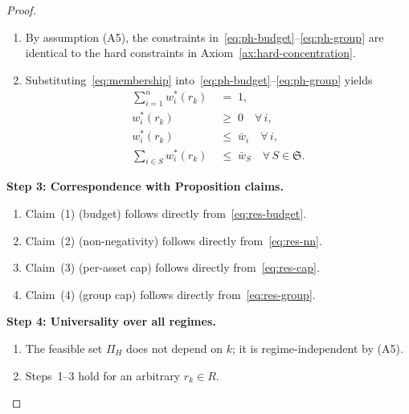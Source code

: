 \documentclass[12pt,openany]{book}
\numberwithin{equation}{chapter}
\theoremstyle{plain}
\theoremstyle{definition}
\theoremstyle{remark}
\def\mathcal#1{#1}%
\begin{document}
\begin{proof}
\begin{enumerate}
  \item By assumption \textup{(A5)}, the constraints
        in~\eqref{eq:ph-budget}--\eqref{eq:ph-group} are
        identical to the hard constraints in
        Axiom~\ref{ax:hard-concentration}.

  \item Substituting~\eqref{eq:membership}
        into~\eqref{eq:ph-budget}--\eqref{eq:ph-group} yields
        \begin{align}
          \sum_{i=1}^{n} w_i^{*}(r_k)
          &\;=\; 1,
          \label{eq:res-budget}\\
          w_i^{*}(r_k)
          &\;\geq\; 0
          \quad \forall\,i,
          \label{eq:res-nn}\\
          w_i^{*}(r_k)
          &\;\leq\; \bar{w}_i
          \quad \forall\,i,
          \label{eq:res-cap}\\
          \sum_{i \in \mathcal{S}} w_i^{*}(r_k)
          &\;\leq\; \bar{w}_{\mathcal{S}}
          \quad \forall\,\mathcal{S} \in \mathfrak{S}.
          \label{eq:res-group}
        \end{align}
\end{enumerate}

\medskip
\noindent
\textbf{Step 3: Correspondence with Proposition claims.}

\begin{enumerate}
  \item Claim~(1) (budget) follows directly
        from~\eqref{eq:res-budget}.

  \item Claim~(2) (non-negativity) follows directly
        from~\eqref{eq:res-nn}.

  \item Claim~(3) (per-asset cap) follows directly
        from~\eqref{eq:res-cap}.

  \item Claim~(4) (group cap) follows directly
        from~\eqref{eq:res-group}.
\end{enumerate}

\medskip
\noindent
\textbf{Step 4: Universality over all regimes.}

\begin{enumerate}
  \item The feasible set $\Pi_H$ does not depend on $k$;
        it is regime-independent by \textup{(A5)}.

  \item Steps~1--3 hold for an arbitrary $r_k \in \mathcal{R}$.


\end{enumerate}
\end{proof}
\end{document}
